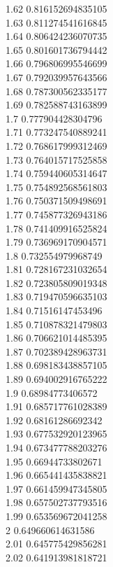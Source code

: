 {1.62	0.816152694835105\\
1.63	0.811274541616845\\
1.64	0.806424236070735\\
1.65	0.801601736794442\\
1.66	0.796806995546699\\
1.67	0.792039957643566\\
1.68	0.787300562335177\\
1.69	0.782588743163899\\
1.7	0.777904428304796\\
1.71	0.773247540889241\\
1.72	0.768617999312469\\
1.73	0.764015717525858\\
1.74	0.759440605314647\\
1.75	0.754892568561803\\
1.76	0.750371509498691\\
1.77	0.745877326943186\\
1.78	0.741409916525824\\
1.79	0.736969170904571\\
1.8	0.732554979968749\\
1.81	0.728167231032654\\
1.82	0.723805809019348\\
1.83	0.719470596635103\\
1.84	0.71516147453496\\
1.85	0.710878321479803\\
1.86	0.706621014485395\\
1.87	0.702389428963731\\
1.88	0.698183438857105\\
1.89	0.694002916765222\\
1.9	0.68984773406572\\
1.91	0.685717761028389\\
1.92	0.68161286692342\\
1.93	0.677532920123965\\
1.94	0.673477788203276\\
1.95	0.66944733802671\\
1.96	0.665441435838821\\
1.97	0.661459947345805\\
1.98	0.657502737793516\\
1.99	0.653569672041258\\
2	0.649660614631586\\
2.01	0.645775429856281\\
2.02	0.641913981818721\\
}
